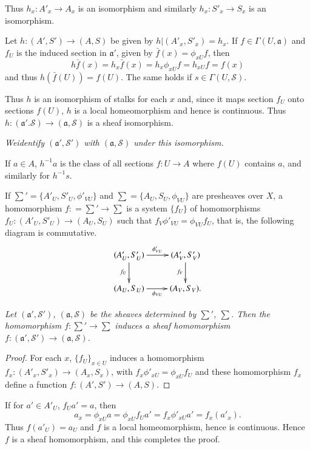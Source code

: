 Thus $h_x : A'_x \to A_x$ is an isomorphism and similarly $h_x : S'_x
\to S_x$ is an isomorphism. 

Let $h : (A', S') \to (A, S)$ be given by $h | (A'_x, S'_x) = h_x$. If
$f \in \Gamma (U, \mathfrak{a})$ and $f_U$ is the induced section in
$\mathfrak{a}'$, given by $\bar{f}(x) = \phi_{xU}f$, then 
$$
h \bar{f}(x) = h_x \bar{f}(x) = h_x \phi_{xU} f = h_{xU}f = f(x) 
$$
and thus $h (\bar{f}(U)) = f(U)$. The same holds if $s \in \Gamma (U,
\mathscr{S})$. 

Thus $h$ is an isomorphism of stalks for each $x$ and, since it maps
section $f_U$ onto sections $f(U)$, $h$ is a local homeomorphism and
hence is continuous. Thus $h : (\mathfrak{a}'. \mathscr{S}) \to
(\mathfrak{a}, \mathscr{S})$ is a sheaf isomorphism. 

\textit{We\pageoriginale identify $(\mathfrak{a}', \mathscr{S}')$ with
  $(\mathfrak{a}, \mathscr{S})$ under this isomorphism.}  

If $a \in A$, $h^{-1}a$ is the class of all sections $f: U \to A$ where
$f(U)$ contains $a$, and similarly for $h^{-1}s$. 

\begin{defi*}
If $\sum'=\{A'_U, S'_U, \phi'_{VU}\}$ and $\sum = \{A_U, S_U,
\phi_{VU}\}$ are preshea\-ves over $X$, a homomorphism $f : =\sum' \to
\sum$ is a system $\{f_U\}$ of homomorphisms $f_U : (A'_U, S'_U) \to
(A_U, S_U)$ such that $f_V \phi'_{VU}= \phi_{VU}f_U$, that is, the
following diagram is commutative. 
\[
\xymatrix{
(A'_U, S'_U) \ar[r]^{\phi'_{VU}} \ar[d]_{f_U}& (A'_V,
  S'_V)\ar[d]_{f_V}\\
(A_U, S_U) \ar[r]_{\phi_{VU}} & (A_V, S_V).
}
\]
\end{defi*}

\textit{Let $(\mathfrak{a}', \mathscr{S}')$,
  $(\mathfrak{a},\mathscr{S})$ be the sheaves 
  determined by $\sum'$, $\sum$. Then the homomorphism $f : \sum' \to
  \sum$ induces a sheaf homomorphism $f :(\mathfrak{a}', \mathscr{S}') \to
  (\mathfrak{a},\mathscr{S})$.} 

\begin{proof}
For each $x$, $\{f_U\}_{x \in U}$ induces a homomorphism $f_x : (A'_x,
S'_x) \to (A_x, S_x)$, with $f_x \phi'_{xU} = \phi_{xU} f_U$ and these
homomorphism $f_x$ define a function $f : (A', S') \to (A, S)$.  
\end{proof} 

\noindent
If for $a' \in A'_U$, $f_U a' = a$, then
$$
a_x = \phi_{xU} a = \phi_{xU}f_U a' =f_x \phi'_{xU} a' = f_x (a'_x). 
$$
Thus $f(a'_U) = a_U$ and $f$ is a local homeomorphism, hence is
continuous. Hence $f$ is a sheaf homomorphism, and this completes the
proof. 

